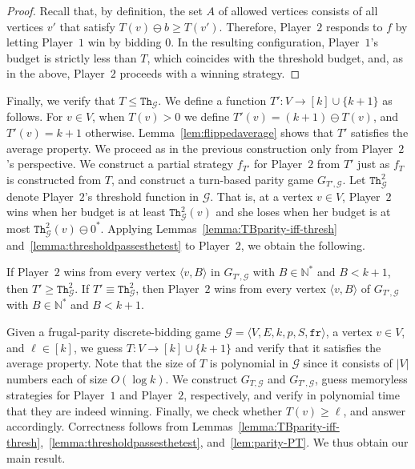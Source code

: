 \documentclass{theoretics}
\newcommand{\PO}{Player~$1$\xspace}
\newcommand{\PT}{Player~$2$\xspace}
\newcommand{\G}{{\mathcal G}}
\newcommand{\fr}{\texttt{fr}}
\newcommand{\Natstr}{\mathbb{N}^*}
\newcommand{\thresh}{\texttt{Th}\xspace}
\newcommand{\zug}[1]{\langle #1  \rangle}
\newcommand{\stam}[1]{}
\renewcommand{\set}[1]{\{ #1  \}}
\newcommand{\predb}[1]{#1 \ominus 0^*\xspace}
\begin{document}
\begin{proof}
Recall that, by definition, the set \(A\) of allowed vertices consists of all vertices \(v'\) that satisfy \(T(v) \ominus b \geq T(v')\). 
Therefore, \PT responds to \(f\) by letting \PO win by bidding \(0\). 
In the resulting configuration, \PO's budget is strictly less than $T$, which coincides with the threshold budget, and, as in the above, \PT proceeds with a winning strategy. 
\stam{
We distinguish three cases:
\begin{itemize}
\item $f$ overbids, namely $b_1 > b$,
\item $f$ underbids, namely $b_1 < b$, and
\item $f$ does not choose an allowed vertex, namely $b_1 = b$ and $v_1 \notin A$. 
\end{itemize}
}
\end{proof} 

Finally, we verify that \(T \leq \thresh_{\G}\). We define a function \(T': V \rightarrow [k] \cup \set{k+1}\) as follows. For \(v \in V\), when $T(v) > 0$ we define $T'(v) = (k+1) \ominus T(v)$, and $T'(v) = k+1$ otherwise. Lemma~\ref{lem:flippedaverage} shows that \(T'\) satisfies the average property.
We proceed as in the previous construction only from \PT's perspective. 
We construct a partial strategy $f_{T'}$ for \PT from $T'$ just as $f_T$ is constructed from $T$, and construct a turn-based parity game $G_{T', \G}$. Let \(\thresh_{\G}^2\) denote \PT's threshold function in \(\G\). That is, at a vertex $v \in V$, \PT wins when her budget is at least $\thresh_\G^2(v)$ and she loses when her budget is at most $\predb{\thresh_\G^2(v)}$. %
Applying Lemmas~\ref{lemma:TBparity-iff-thresh} and~\ref{lemma:thresholdpassesthetest} to \PT, we obtain the following.

\begin{lemma}
\label{lem:parity-PT}
    If \PT wins from every vertex $\zug{v, B}$ in $G_{T', \G}$ with $B \in \Natstr$ and $B < k+1$, then $T' \geq \thresh^2_{\G}$.
    If $T' \equiv \thresh^2_{\G}$, then \PT wins from every vertex $\zug{v, B}$ of $G_{T', \G}$ with $B \in \Natstr$ and $B < k+1$. 
\end{lemma}


Given a frugal-parity discrete-bidding game $\G = \zug{V, E, k, p, S, \fr}$, a vertex $v \in V$, and $\ell \in [k]$, we guess $T: V \rightarrow [k] \cup \set{k+1}$ and verify that it satisfies the average property. Note that the size of $T$ is polynomial in $\G$ since it consists of $|V|$ numbers each of size $O(\log k)$. We construct $G_{T, \G}$ and $G_{T', \G}$, guess memoryless strategies for \PO and \PT, respectively, and verify in polynomial time that they are indeed winning.  Finally, we check whether $T(v) \geq \ell$, and answer accordingly. Correctness follows from Lemmas~\ref{lemma:TBparity-iff-thresh},~\ref{lemma:thresholdpassesthetest}, and~\ref{lem:parity-PT}. We thus obtain our main result.
\end{document}
